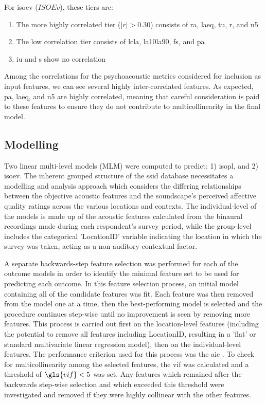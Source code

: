    For \gls{isoev} ($ISOEv$), these tiers are:
   \begin{enumerate}
     \item The more highly correlated tier ($|r| > 0.30$) consists of \gls{ra}, \gls{laeq}, \gls{tu}, \gls{r}, and \gls{n5}
     \item The low correlation tier consists of \gls{lcla}, \gls{la10la90}, \gls{fs}, and \gls{pa}
     \item \gls{iu} and \gls{s} show no correlation
   \end{enumerate}

   Among the correlations for the psychoacoustic metrics considered for inclusion as input features, we can see several highly inter-correlated features. As expected, \gls{pa}, \gls{laeq}, and \gls{n5} are highly correlated, meaning that careful consideration is paid to these features to ensure they do not contribute to multicollinearity in the final model.

 \subsection{Modelling}

   Two linear multi-level models (MLM) were computed to predict: 1) \gls{isopl}, and 2) \gls{isoev}. The inherent grouped structure of the \gls{ssid} database necessitates a modelling and analysis approach which considers the differing relationships between the objective acoustic features and the soundscape's perceived affective quality ratings across the various locations and contexts. The individual-level of the models is made up of the acoustic features calculated from the binaural recordings made during each respondent's survey period, while the group-level includes the categorical 'LocationID' variable indicating the location in which the survey was taken, acting as a non-auditory contextual factor.

   A separate backwards-step feature selection was performed for each of the outcome models in order to identify the minimal feature set to be used for predicting each outcome. In this feature selection process, an initial model containing all of the candidate features was fit. Each feature was then removed from the model one at a time, then the best-performing model is selected and the procedure continues step-wise until no improvement is seen by removing more features. This process is carried out first on the location-level features (including the potential to remove all features including LocationID, resulting in a 'flat' or standard multivariate linear regression model), then on the individual-level features. The performance criterion used for this process was the \gls{aic} \citep{Akaike1974New}. To check for multicollinearity among the selected features, the \gls{vif} was calculated and a threshold of $\gls{vif} < 5$ was set. Any features which remained after the backwards step-wise selection and which exceeded this threshold were investigated and removed if they were highly collinear with the other features.

